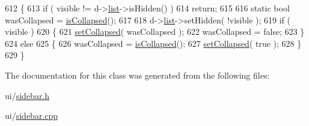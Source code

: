 \begin{DoxyCode}
612 \{
613     \textcolor{keywordflow}{if} ( visible != d->\hyperlink{classSidebar_1_1Private_a0b3cabc80bb0d0d9259723cbe786908e}{list}->isHidden() )
614         \textcolor{keywordflow}{return};
615 
616     \textcolor{keyword}{static} \textcolor{keywordtype}{bool} wasCollapsed = \hyperlink{classSidebar_a7faa5e2df81f4fc935dfc85cead3efe6}{isCollapsed}();
617 
618     d->\hyperlink{classSidebar_1_1Private_a0b3cabc80bb0d0d9259723cbe786908e}{list}->setHidden( !visible );
619     \textcolor{keywordflow}{if} ( visible )
620     \{
621         \hyperlink{classSidebar_a3bcef186eab8bd313c0c4e92948e605a}{setCollapsed}( wasCollapsed );
622         wasCollapsed = \textcolor{keyword}{false};
623     \}
624     \textcolor{keywordflow}{else}
625     \{
626         wasCollapsed = \hyperlink{classSidebar_a7faa5e2df81f4fc935dfc85cead3efe6}{isCollapsed}();
627         \hyperlink{classSidebar_a3bcef186eab8bd313c0c4e92948e605a}{setCollapsed}( \textcolor{keyword}{true} );
628     \}
629 \}
\end{DoxyCode}


The documentation for this class was generated from the following files\+:\begin{DoxyCompactItemize}
\item 
ui/\hyperlink{sidebar_8h}{sidebar.\+h}\item 
ui/\hyperlink{sidebar_8cpp}{sidebar.\+cpp}\end{DoxyCompactItemize}
